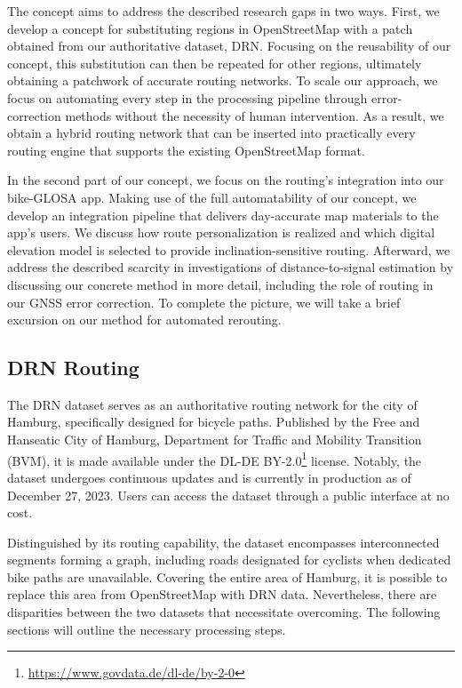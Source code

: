 The concept aims to address the described research gaps in two ways. First, we develop a concept for substituting regions in OpenStreetMap with a patch obtained from our authoritative dataset, DRN. Focusing on the reusability of our concept, this substitution can then be repeated for other regions, ultimately obtaining a patchwork of accurate routing networks. To scale our approach, we focus on automating every step in the processing pipeline through error-correction methods without the necessity of human intervention. As a result, we obtain a hybrid routing network that can be inserted into practically every routing engine that supports the existing OpenStreetMap format.

In the second part of our concept, we focus on the routing's integration into our bike-GLOSA app. Making use of the full automatability of our concept, we develop an integration pipeline that delivers day-accurate map materials to the app's users. We discuss how route personalization is realized and which digital elevation model is selected to provide inclination-sensitive routing. Afterward, we address the described scarcity in investigations of distance-to-signal estimation by discussing our concrete method in more detail, including the role of routing in our GNSS error correction. To complete the picture, we will take a brief excursion on our method for automated rerouting.

\subsection{DRN Routing}

The DRN dataset serves as an authoritative routing network for the city of Hamburg, specifically designed for bicycle paths. Published by the Free and Hanseatic City of Hamburg, Department for Traffic and Mobility Transition (BVM), it is made available under the DL-DE BY-2.0\footnote{\url{https://www.govdata.de/dl-de/by-2-0}} license. Notably, the dataset undergoes continuous updates and is currently in production as of December 27, 2023. Users can access the dataset through a public interface at no cost. 

Distinguished by its routing capability, the dataset encompasses interconnected segments forming a graph, including roads designated for cyclists when dedicated bike paths are unavailable. Covering the entire area of Hamburg, it is possible to replace this area from OpenStreetMap with DRN data. Nevertheless, there are disparities between the two datasets that necessitate overcoming. The following sections will outline the necessary processing steps.

